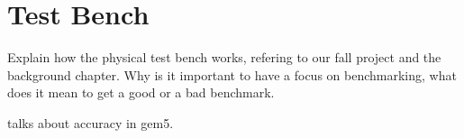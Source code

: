 \section{Test Bench}
Explain how the physical test bench works, refering to our fall project and the
background chapter. Why is it important to have a focus on benchmarking, what
does it mean to get a good or a bad benchmark.

\cite{butko2012accuracy} talks about accuracy in gem5.

